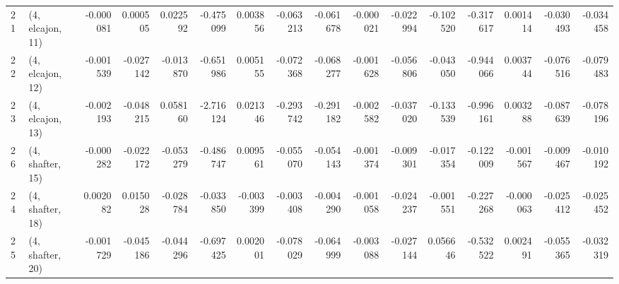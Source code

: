 \begin{tabular}{llrrrrrrrrrrrrrr}
21 &  (4, elcajon, 11) &  -0.000081 &  0.000505 &  0.022592 &  -0.475099 &  0.003856 &  -0.063213 & -0.061678 & -0.000021 & -0.022994 & -0.102520 &  -0.317617 &  0.001414 & -0.030493 & -0.034458 \\
22 &  (4, elcajon, 12) &  -0.001539 & -0.027142 & -0.013870 &  -0.651986 &  0.005155 &  -0.072368 & -0.068277 & -0.001628 & -0.056806 & -0.043050 &  -0.944066 &  0.003744 & -0.076516 & -0.079483 \\
23 &  (4, elcajon, 13) &  -0.002193 & -0.048215 &  0.058160 &  -2.716124 &  0.021346 &  -0.293742 & -0.291182 & -0.002582 & -0.037020 & -0.133539 &  -0.996161 &  0.003288 & -0.087639 & -0.078196 \\
26 &  (4, shafter, 15) &  -0.000282 & -0.022172 & -0.053279 &  -0.486747 &  0.009561 &  -0.055070 & -0.054143 & -0.001374 & -0.009301 & -0.017354 &  -0.122009 & -0.001567 & -0.009467 & -0.010192 \\
24 &  (4, shafter, 18) &   0.002082 &  0.015028 & -0.028784 &  -0.033850 & -0.003399 &  -0.003408 & -0.004290 & -0.001058 & -0.024237 & -0.001551 &  -0.227268 & -0.000063 & -0.025412 & -0.025452 \\
25 &  (4, shafter, 20) &  -0.001729 & -0.045186 & -0.044296 &  -0.697425 &  0.002001 &  -0.078029 & -0.064999 & -0.003088 & -0.027144 &  0.056646 &  -0.532522 &  0.002491 & -0.055365 & -0.032319 \\
\bottomrule
\end{tabular}
